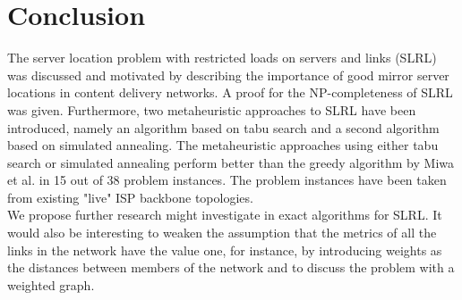 \documentclass [12pt]{article}
\begin{document}
\section{Conclusion}
The server location problem with restricted loads on servers and links (SLRL) was discussed and motivated by describing the importance of good mirror server locations in content delivery networks.
A proof for the NP-completeness of SLRL was given. Furthermore, two metaheuristic approaches to SLRL have been introduced, namely an algorithm based on tabu search and a second algorithm 
based on simulated annealing.
The metaheuristic approaches using either tabu search or simulated annealing perform better than the greedy algorithm by Miwa et al. \cite{mirrorserver} in 15 out of 38 problem instances. 
The problem instances have been taken from existing "live"
ISP backbone topologies.\\ We propose further research might investigate in exact algorithms for SLRL. It would also be interesting to weaken 
the assumption that the metrics of all the links in the network have the value one, for instance, by introducing weights as the distances between members of the network
and to discuss the problem with a weighted graph.
\newpage

\end{document}
